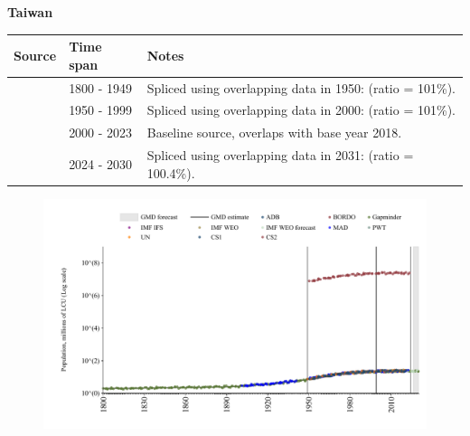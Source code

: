 \documentclass[12pt,a4paper,landscape]{article}
\begin{document}
\begin{adjustbox}{max totalsize={\paperwidth}{\paperheight},center}
\begin{minipage}[t][\textheight][t]{\textwidth}
\vspace*{0.5cm}
{}
\begin{center}
{\Large\bfseries Taiwan}
\end{center}
\vspace{0.5cm}
\begin{table}[H]
\centering
\small
\begin{tabular}{|l|l|l|}
\hline
\textbf{Source} & \textbf{Time span} & \textbf{Notes} \\
\hline
\rowcolor{white}\cite{Gapminder}& 1800 - 1949 &Spliced using overlapping data in 1950: (ratio = 101\%).\\
\rowcolor{lightgray}\cite{IMF_IFS}& 1950 - 1999 &Spliced using overlapping data in 2000: (ratio = 101\%).\\
\rowcolor{white}\cite{ADB}& 2000 - 2023 &Baseline source, overlaps with base year 2018.\\
\rowcolor{lightgray}\cite{Gapminder}& 2024 - 2030 &Spliced using overlapping data in 2031: (ratio = 100.4\%).\\
\hline
\end{tabular}
\end{table}
\begin{figure}[H]
\centering
\includegraphics[width=\textwidth,height=0.6\textheight,keepaspectratio]{graphs/TWN_pop.pdf}
\end{figure}
\end{minipage}
\end{adjustbox}
\end{document}
